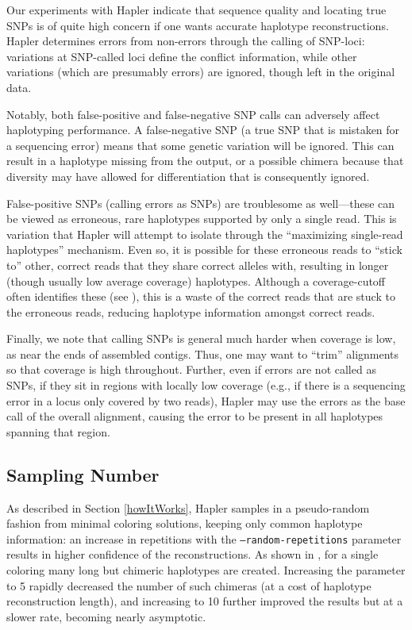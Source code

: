 \documentclass[11pt]{llncs}
\begin{document}
Our experiments with Hapler indicate that sequence quality and locating true SNPs is of quite high concern if one wants accurate haplotype 
reconstructions. Hapler determines errors from non-errors through the calling of SNP-loci: variations at SNP-called loci define the conflict 
information, while other variations (which are presumably errors) are ignored, though left in the original data.

Notably, both false-positive and false-negative SNP calls can adversely affect haplotyping performance. A false-negative SNP (a true SNP that is 
mistaken for a sequencing error) means that some genetic variation will be ignored. This can result in a haplotype missing from the output, or a 
possible chimera because that diversity may have allowed for differentiation that is consequently ignored.

False-positive SNPs (calling errors as SNPs) are troublesome as well---these can be viewed as erroneous, rare haplotypes supported by only a single 
read. This is variation that Hapler will attempt to isolate through the ``maximizing single-read haplotypes'' mechanism. Even so, it is possible for 
these erroneous reads to ``stick to'' other, correct reads that they share correct alleles with, resulting in longer (though usually low average 
coverage) haplotypes. Although a coverage-cutoff often identifies these (see \cite{ONEIL2011}), this is a waste of the correct reads that are 
stuck to the erroneous reads, reducing haplotype information amongst correct reads.

Finally, we note that calling SNPs is general much harder when coverage is low, as near the ends of assembled contigs. Thus, one may want to 
``trim'' alignments so that coverage is high throughout. Further, even if errors are not called as SNPs, if they sit in regions with locally low 
coverage (e.g., if there is a sequencing error in a locus only covered by two reads), Hapler may use the errors as the base call of the overall 
alignment, causing the error to be present in all haplotypes spanning that region.

\subsection{Sampling Number}

As described in Section \ref{howItWorks}, Hapler samples in a pseudo-random fashion from minimal coloring solutions, keeping only common
haplotype information: an increase in repetitions with the \texttt{--random-repetitions} parameter results in higher confidence of the
reconstructions. As shown in \cite{ONEIL2011}, for a single coloring many long but chimeric haplotypes are created. Increasing the
parameter to 5 rapidly decreased the number of such chimeras (at a cost of haplotype reconstruction length), and increasing to 10 further
improved the results but at a slower rate, becoming nearly asymptotic. 
\end{document}
